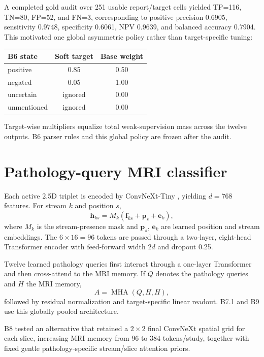 \documentclass[preprint,12pt]{elsarticle}
\begin{document}
A completed gold audit over 251 usable report/target cells yielded TP=116, TN=80, FP=52, and FN=3, corresponding to positive precision 0.6905, sensitivity 0.9748, specificity 0.6061, NPV 0.9639, and balanced accuracy 0.7904. This motivated one global asymmetric policy rather than target-specific tuning:
\begin{center}
\begin{tabular}{lcc}
\toprule
B6 state & Soft target & Base weight \\
\midrule
positive & 0.85 & 0.50 \\
negated & 0.05 & 1.00 \\
uncertain & ignored & 0.00 \\
unmentioned & ignored & 0.00 \\
\bottomrule
\end{tabular}
\end{center}
Target-wise multipliers equalize total weak-supervision mass across the twelve outputs. B6 parser rules and this global policy are frozen after the audit.

\section{Pathology-query MRI classifier}
\label{sec:model}

Each active 2.5D triplet is encoded by ConvNeXt-Tiny \cite{liu2022convnext}, yielding $d=768$ features. For stream $k$ and position $s$,
\begin{equation}
\mathbf h_{ks}=M_k(\mathbf f_{ks}+\mathbf p_s+\mathbf e_k),
\end{equation}
where $M_k$ is the stream-presence mask and $\mathbf p_s$, $\mathbf e_k$ are learned position and stream embeddings. The $6\times16=96$ tokens are passed through a two-layer, eight-head Transformer encoder with feed-forward width $2d$ and dropout 0.25.

Twelve learned pathology queries first interact through a one-layer Transformer and then cross-attend to the MRI memory. If $Q$ denotes the pathology queries and $H$ the MRI memory,
\begin{equation}
A=\operatorname{MHA}(Q,H,H),
\end{equation}
followed by residual normalization and target-specific linear readout. B7.1 and B9 use this globally pooled architecture.

B8 tested an alternative that retained a $2\times2$ final ConvNeXt spatial grid for each slice, increasing MRI memory from 96 to 384 tokens/study, together with fixed gentle pathology-specific stream/slice attention priors.
\end{document}
